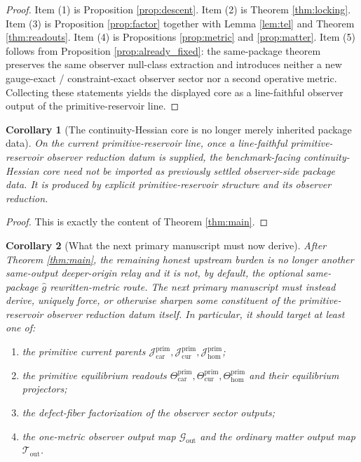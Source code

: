 \documentclass[11pt]{article}
\newcommand{\MetricOut}{\mathscr G_{\mathrm{out}}}
\newcommand{\MatterOut}{\mathscr T_{\mathrm{out}}}
\newcommand{\Car}{\mathrm{car}}
\newcommand{\Cur}{\mathrm{cur}}
\newcommand{\Hom}{\mathrm{hom}}
\newcommand{\PrimCurrent}[1]{\mathcal J_{#1}^{\mathrm{prim}}}
\newcommand{\PrimTheta}[1]{\Theta_{#1}^{\mathrm{prim}}}
\newtheorem{corollary}{Corollary}
\begin{document}
\begin{proof}
Item (1) is Proposition \ref{prop:descent}. Item (2) is Theorem \ref{thm:locking}. Item (3) is Proposition \ref{prop:factor} together with Lemma \ref{lem:tel} and Theorem \ref{thm:readouts}. Item (4) is Propositions \ref{prop:metric} and \ref{prop:matter}. Item (5) follows from Proposition \ref{prop:already_fixed}: the same-package theorem preserves the same observer null-class extraction and introduces neither a new gauge-exact / constraint-exact observer sector nor a second operative metric. Collecting these statements yields the displayed core as a line-faithful observer output of the primitive-reservoir line.
\end{proof}

\begin{corollary}[The continuity-Hessian core is no longer merely inherited package data]
\label{cor:notinherited}
On the current primitive-reservoir line, once a line-faithful primitive-reservoir observer reduction datum is supplied, the benchmark-facing continuity-Hessian core need not be imported as previously settled observer-side package data. It is produced by explicit primitive-reservoir structure and its observer reduction.
\end{corollary}

\begin{proof}
This is exactly the content of Theorem \ref{thm:main}.
\end{proof}

\begin{corollary}[What the next primary manuscript must now derive]
\label{cor:next}
After Theorem \ref{thm:main}, the remaining honest upstream burden is no longer another same-output deeper-origin relay and it is not, by default, the optional same-package \(\widehat g\) rewritten-metric route. The next primary manuscript must instead derive, uniquely force, or otherwise sharpen some constituent of the primitive-reservoir observer reduction datum itself. In particular, it should target at least one of:
\begin{enumerate}
    \item the primitive current parents \(\PrimCurrent{\Car},\PrimCurrent{\Cur},\PrimCurrent{\Hom}\);
    \item the primitive equilibrium readouts \(\PrimTheta{\Car},\PrimTheta{\Cur},\PrimTheta{\Hom}\) and their equilibrium projectors;
    \item the defect-fiber factorization of the observer sector outputs;
    \item the one-metric observer output map \(\MetricOut\) and the ordinary matter output map \(\MatterOut\).
\end{enumerate}
\end{corollary}
\end{document}
